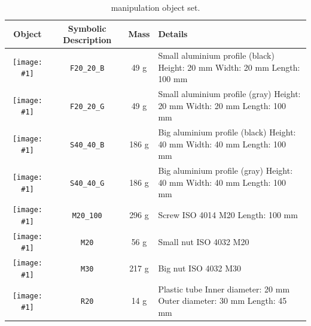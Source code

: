 \newcommand{\imageView}[1]{\texttt{[image: \#1]}}
{
\newcommand{\rowpadding}{0.4cm}
\setlength\extrarowheight{\rowpadding}
\begin{table}[p]
\begin{tabular}{|c|c|c|m{6cm}|}
\hline
Object & Symbolic Description & Mass & Details \\
\hline
\imageView{./images/F20_20_B.jpg} & \texttt{F20\_20\_B} & 49 g & Small aluminium profile (black)\newline
 Height: 20 mm \newline
 Width: 20 mm \newline
 Length: 100 mm \\ [\rowpadding]
\hline
\imageView{./images/F20_20_G.jpg} & \texttt{F20\_20\_G} & 49 g & Small aluminium profile (gray)\newline
 Height: 20 mm \newline
 Width: 20 mm \newline
 Length: 100 mm \\ [\rowpadding]
\hline
\imageView{./images/S40_40_B.jpg} & \texttt{S40\_40\_B} & 186 g & Big aluminium profile (black)\newline
 Height: 40 mm \newline
 Width: 40 mm \newline
 Length: 100 mm \\ [\rowpadding]
\hline
\imageView{./images/S40_40_G.jpg} & \texttt{S40\_40\_G} & 186 g & Big aluminium profile (gray)\newline
 Height: 40 mm \newline
 Width: 40 mm \newline
 Length: 100 mm \\ [\rowpadding]
\hline
\imageView{./images/M20_100.jpg} & \texttt{M20\_100} & 296 g & Screw\newline
 ISO 4014 \newline
 M20 \newline
 Length: 100 mm \\ [\rowpadding]
\hline
\imageView{./images/M20.jpg} & \texttt{M20} & 56 g & Small nut\newline
 ISO 4032 \newline
 M20 \\ [\rowpadding]
\hline
\imageView{./images/M30.jpg} & \texttt{M30} & 217 g & Big nut\newline
 ISO 4032 \newline
 M30 \\ [\rowpadding]
\hline
\imageView{./images/R20.jpg} & \texttt{R20} & 14 g & Plastic tube\newline
 Inner diameter: 20 mm \newline
 Outer diameter: 30 mm \newline
 Length: 45 mm \\ [\rowpadding]
\hline
\end{tabular}
\caption{\RCAW manipulation object set.}
\label{tab:manipulation_objects}
\end{table}


}
